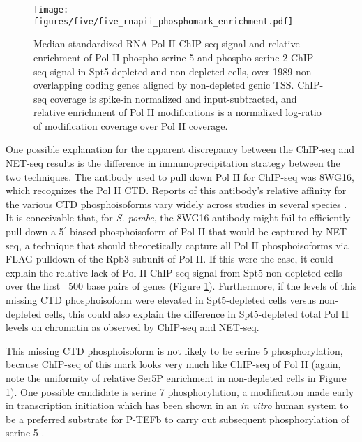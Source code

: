 \begin{figure}
    \texttt{[image: figures/five/five\_rnapii\_phosphomark\_enrichment.pdf]}
    \caption[Enrichment of RNA Pol II phospho-serine 5 and phospho-serine 2 over non-overlapping coding genes, in Spt5-depleted and non-depleted cells.]{Median standardized RNA Pol II ChIP-seq signal and relative enrichment of Pol II phospho-serine 5 and phospho-serine 2 ChIP-seq signal in Spt5-depleted and non-depleted cells, over 1989 non-overlapping coding genes aligned by non-depleted genic TSS. ChIP-seq coverage is spike-in normalized and input-subtracted, and relative enrichment of Pol II modifications is a normalized log-ratio of modification coverage over Pol II coverage.}
    \label{fig:five_rnapii_phosphomark_enrichment}
\end{figure}

One possible explanation for the apparent discrepancy between the ChIP-seq and NET-seq results is the difference in immunoprecipitation strategy between the two techniques.
The antibody used to pull down Pol II for ChIP-seq was 8WG16, which recognizes the Pol II CTD.
Reports of this antibody's relative affinity for the various CTD phosphoisoforms vary widely across studies in several species \citep{zeitlinger2007}.
It is conceivable that, for \textit{S. pombe}, the 8WG16 antibody might fail to efficiently pull down a 5$^\prime$-biased phosphoisoform of Pol II that would be captured by NET-seq, a technique that should theoretically capture all Pol II phosphoisoforms via FLAG pulldown of the Rpb3 subunit of Pol II.
If this were the case, it could explain the relative lack of Pol II ChIP-seq signal from Spt5 non-depleted cells over the first ~500 base pairs of genes (Figure \ref{fig:five_rnapii_phosphomark_enrichment}).
Furthermore, if the levels of this missing CTD phosphoisoform were elevated in Spt5-depleted cells versus non-depleted cells, this could also explain the difference in Spt5-depleted total Pol II levels on chromatin as observed by ChIP-seq and NET-seq.

This missing CTD phosphoisoform is not likely to be serine 5 phosphorylation, because ChIP-seq of this mark looks very much like ChIP-seq of Pol II (again, note the uniformity of relative Ser5P enrichment in non-depleted cells in Figure \ref{fig:five_rnapii_phosphomark_enrichment}).
One possible candidate is serine 7 phosphorylation, a modification made early in transcription initiation which has been shown in an \textit{in vitro} human system to be a preferred substrate for P-TEFb to carry out subsequent phosphorylation of serine 5 \citep{czudnochowski2012}.

